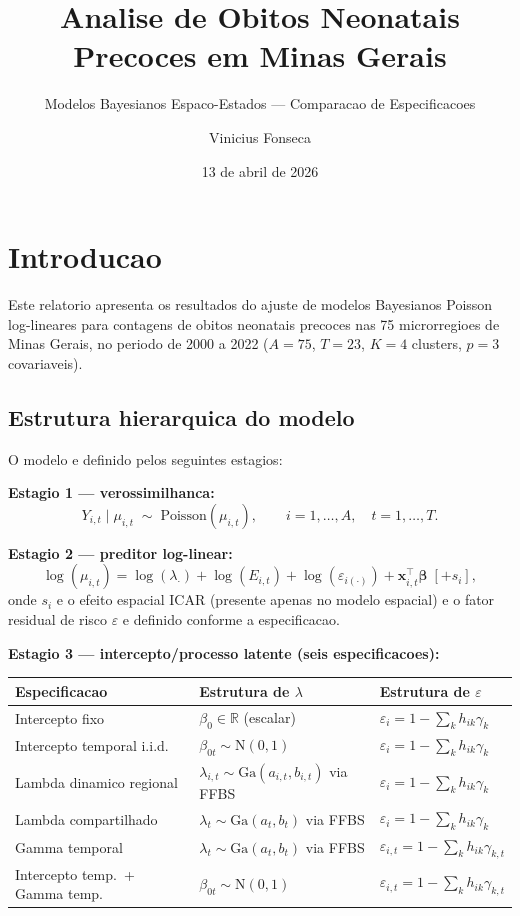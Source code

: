 \documentclass[
]{article}
\title{Analise de Obitos Neonatais Precoces em Minas Gerais}
\subtitle{Modelos Bayesianos Espaco-Estados --- Comparacao de
Especificacoes}
\author{Vinicius Fonseca}
\date{13 de abril de 2026}
\begin{document}
\maketitle

{
\setcounter{tocdepth}{3}
\tableofcontents
}
\section{Introducao}\label{introducao}

Este relatorio apresenta os resultados do ajuste de modelos Bayesianos
Poisson log-lineares para contagens de obitos neonatais precoces nas 75
microrregioes de Minas Gerais, no periodo de 2000 a 2022 (\(A = 75\),
\(T = 23\), \(K = 4\) clusters, \(p = 3\) covariaveis).

\subsection{Estrutura hierarquica do
modelo}\label{estrutura-hierarquica-do-modelo}

O modelo e definido pelos seguintes estagios:

\textbf{Estagio 1 --- verossimilhanca:} \[
Y_{i,t} \mid \mu_{i,t} \;\sim\; \text{Poisson}(\mu_{i,t}), \qquad
i = 1,\ldots,A,\quad t = 1,\ldots,T.
\]

\textbf{Estagio 2 --- preditor log-linear:} \[
\log(\mu_{i,t}) = \log(\lambda_{\cdot}) + \log(E_{i,t}) + \log(\varepsilon_{i(\cdot)})
                  + \mathbf{x}_{i,t}^\top \boldsymbol{\beta} \;[+ s_i],
\] onde \(s_i\) e o efeito espacial ICAR (presente apenas no modelo
espacial) e o fator residual de risco \(\varepsilon\) e definido
conforme a especificacao.

\textbf{Estagio 3 --- intercepto/processo latente (seis
especificacoes):}

\begin{center}
\begin{tabular}{lll}
\toprule
Especificacao & Estrutura de $\lambda$ & Estrutura de $\varepsilon$ \\
\midrule
Intercepto fixo &
  $\beta_0 \in \mathbb{R}$ (escalar) &
  $\varepsilon_i = 1 - \sum_k h_{ik}\gamma_k$ \\
Intercepto temporal i.i.d. &
  $\beta_{0t} \sim \mathrm{N}(0,1)$ &
  $\varepsilon_i = 1 - \sum_k h_{ik}\gamma_k$ \\
Lambda dinamico regional &
  $\lambda_{i,t} \sim \mathrm{Ga}(a_{i,t},b_{i,t})$ via FFBS &
  $\varepsilon_i = 1 - \sum_k h_{ik}\gamma_k$ \\
Lambda compartilhado &
  $\lambda_t \sim \mathrm{Ga}(a_t,b_t)$ via FFBS &
  $\varepsilon_i = 1 - \sum_k h_{ik}\gamma_k$ \\
Gamma temporal &
  $\lambda_t \sim \mathrm{Ga}(a_t,b_t)$ via FFBS &
  $\varepsilon_{i,t} = 1 - \sum_k h_{ik}\gamma_{k,t}$ \\
Intercepto temp.\ + Gamma temp. &
  $\beta_{0t} \sim \mathrm{N}(0,1)$ &
  $\varepsilon_{i,t} = 1 - \sum_k h_{ik}\gamma_{k,t}$ \\
\bottomrule
\end{tabular}
\end{center}
\end{document}
